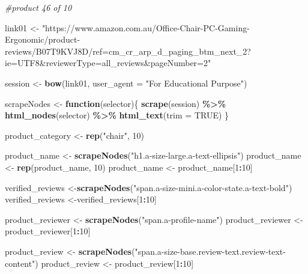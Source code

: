 \documentclass[
]{article}
\newenvironment{Shaded}{\begin{snugshade}}{\end{snugshade}}
\newcommand{\AttributeTok}[1]{\textcolor[rgb]{0.13,0.29,0.53}{#1}}
\newcommand{\CommentTok}[1]{\textcolor[rgb]{0.56,0.35,0.01}{\textit{#1}}}
\newcommand{\ConstantTok}[1]{\textcolor[rgb]{0.56,0.35,0.01}{#1}}
\newcommand{\ControlFlowTok}[1]{\textcolor[rgb]{0.13,0.29,0.53}{\textbf{#1}}}
\newcommand{\DecValTok}[1]{\textcolor[rgb]{0.00,0.00,0.81}{#1}}
\newcommand{\FunctionTok}[1]{\textcolor[rgb]{0.13,0.29,0.53}{\textbf{#1}}}
\newcommand{\NormalTok}[1]{#1}
\newcommand{\OtherTok}[1]{\textcolor[rgb]{0.56,0.35,0.01}{#1}}
\newcommand{\SpecialCharTok}[1]{\textcolor[rgb]{0.81,0.36,0.00}{\textbf{#1}}}
\newcommand{\StringTok}[1]{\textcolor[rgb]{0.31,0.60,0.02}{#1}}
\begin{document}
\begin{Shaded}
\begin{Highlighting}[]
\CommentTok{\#product 46 of 10}

\NormalTok{link01 }\OtherTok{\textless{}{-}} \StringTok{"https://www.amazon.com.au/Office{-}Chair{-}PC{-}Gaming{-}Ergonomic/product{-}reviews/B07T9KVJ8D/ref=cm\_cr\_arp\_d\_paging\_btm\_next\_2?ie=UTF8\&reviewerType=all\_reviews\&pageNumber=2"}


\NormalTok{  session }\OtherTok{\textless{}{-}} \FunctionTok{bow}\NormalTok{(link01,}
               \AttributeTok{user\_agent =} \StringTok{"For Educational Purpose"}\NormalTok{)}

\NormalTok{  scrapeNodes }\OtherTok{\textless{}{-}} \ControlFlowTok{function}\NormalTok{(selector)\{}
    \FunctionTok{scrape}\NormalTok{(session) }\SpecialCharTok{\%\textgreater{}\%}
      \FunctionTok{html\_nodes}\NormalTok{(selector) }\SpecialCharTok{\%\textgreater{}\%}
      \FunctionTok{html\_text}\NormalTok{(}\AttributeTok{trim =} \ConstantTok{TRUE}\NormalTok{)}
\NormalTok{  \}}

\NormalTok{  product\_category }\OtherTok{\textless{}{-}} \FunctionTok{rep}\NormalTok{(}\StringTok{"chair"}\NormalTok{, }\DecValTok{10}\NormalTok{)}

\NormalTok{  product\_name }\OtherTok{\textless{}{-}} \FunctionTok{scrapeNodes}\NormalTok{(}\StringTok{"h1.a{-}size{-}large.a{-}text{-}ellipsis"}\NormalTok{)}
\NormalTok{  product\_name }\OtherTok{\textless{}{-}} \FunctionTok{rep}\NormalTok{(product\_name, }\DecValTok{10}\NormalTok{)}
\NormalTok{  product\_name }\OtherTok{\textless{}{-}}\NormalTok{ product\_name[}\DecValTok{1}\SpecialCharTok{:}\DecValTok{10}\NormalTok{]}
  
\NormalTok{  verified\_reviews }\OtherTok{\textless{}{-}}\FunctionTok{scrapeNodes}\NormalTok{(}\StringTok{"span.a{-}size{-}mini.a{-}color{-}state.a{-}text{-}bold"}\NormalTok{)}
\NormalTok{  verified\_reviews }\OtherTok{\textless{}{-}}\NormalTok{verified\_reviews[}\DecValTok{1}\SpecialCharTok{:}\DecValTok{10}\NormalTok{]}
  
\NormalTok{  product\_reviewer }\OtherTok{\textless{}{-}} \FunctionTok{scrapeNodes}\NormalTok{(}\StringTok{"span.a{-}profile{-}name"}\NormalTok{)}
\NormalTok{  product\_reviewer }\OtherTok{\textless{}{-}}\NormalTok{ product\_reviewer[}\DecValTok{1}\SpecialCharTok{:}\DecValTok{10}\NormalTok{]}
  
\NormalTok{  product\_review }\OtherTok{\textless{}{-}} \FunctionTok{scrapeNodes}\NormalTok{(}\StringTok{"span.a{-}size{-}base.review{-}text.review{-}text{-}content"}\NormalTok{)}
\NormalTok{  product\_review }\OtherTok{\textless{}{-}}\NormalTok{ product\_review[}\DecValTok{1}\SpecialCharTok{:}\DecValTok{10}\NormalTok{]}
  

\end{Highlighting}
\end{Shaded}
\end{document}
